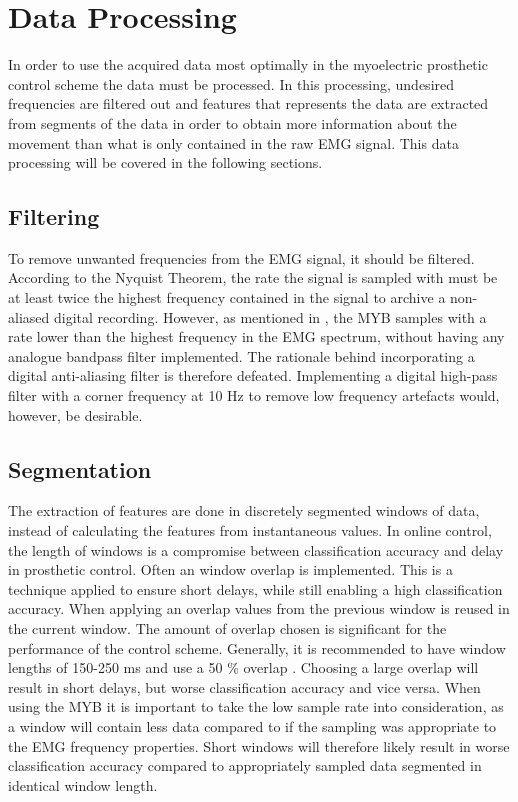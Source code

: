 \section{Data Processing}
In order to use the acquired data most optimally in the myoelectric prosthetic control scheme the data must be processed. In this processing, undesired frequencies are filtered out and features that represents the data are extracted from segments of the data in order to obtain more information about the movement than what is only contained in the raw EMG signal. This data processing will be covered in the following sections. 

\subsection{Filtering}
To remove unwanted frequencies from the EMG signal, it should be filtered. According to the Nyquist Theorem, the rate the signal is sampled with must be at least twice the highest frequency contained in the signal to archive a non-aliased digital recording. However, as mentioned in , the MYB samples with a rate lower than the highest frequency in the EMG spectrum, without having any analogue bandpass filter implemented. The rationale behind incorporating a digital anti-aliasing filter is therefore defeated. Implementing a digital high-pass filter with a corner frequency at 10 Hz to remove low frequency artefacts would, however, be desirable. \cite{Cram2012} 

\subsection{Segmentation}
The extraction of features are done in discretely segmented windows of data, instead of calculating the features from instantaneous values. In online control, the length of windows is a compromise between classification accuracy and delay in prosthetic control. Often an window overlap is implemented. This is a technique applied to ensure short delays, while still enabling a high classification accuracy. When applying an overlap values from the previous window is reused in the current window. The amount of overlap chosen is significant for the performance of the control scheme.  Generally, it is recommended to have window lengths of 150-250 ms and use a 50 $\percent$ overlap \cite{Menon2017}. Choosing a large overlap will result in short delays, but worse classification accuracy and vice versa. When using the MYB it is important to take the low sample rate into consideration, as a window will contain less data compared to if the sampling was appropriate to the EMG frequency properties. \cite{Menon2017} Short windows will therefore likely result in worse classification accuracy compared to appropriately sampled data segmented in identical window length.


